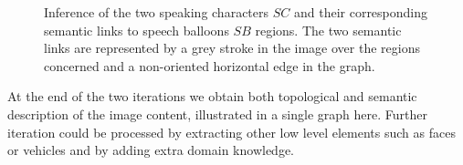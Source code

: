  \begin{figure}[!ht]  %
   \centering
   \hspace{0.5em}
  \caption[Inference of the speaking characters and their corresponding semantic links to speech balloons]{Inference of the two speaking characters $SC$ and their corresponding semantic links to speech balloons $SB$ regions.
  The two semantic links are represented by a grey stroke in the image over the regions concerned and a non-oriented horizontal edge in the graph.
  }
  \label{fig:kn:final_information}
 \end{figure}

At the end of the two iterations we obtain both topological and semantic description of the image content, illustrated in a single graph here.
Further iteration could be processed by extracting other low level elements such as faces or vehicles and by adding extra domain knowledge.



